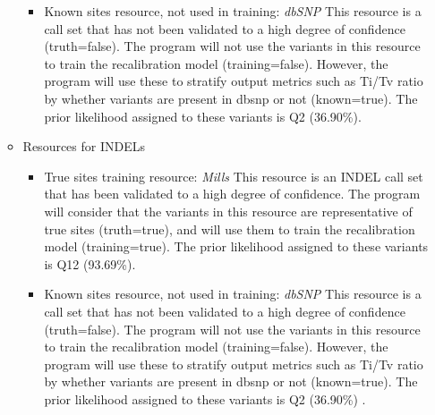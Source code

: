 \begin{itemize}
\begin{itemize}
\begin{itemize}
			\item Known sites resource, not used in training: \textit{dbSNP} \newline
This resource is a call set that has not been validated to a high degree of confidence (truth=false). The program will not use the variants in this resource to train the recalibration model (training=false). However, the program will use these to stratify output metrics such as Ti/Tv ratio by whether variants are present in dbsnp or not (known=true). The prior likelihood assigned to these variants is Q2 (36.90\%).
        \end{itemize}
    	\item Resources for INDELs
        \begin{itemize}
        	\item True sites training resource: \textit{Mills} \newline
This resource is an INDEL call set that has been validated to a high degree of confidence. The program will consider that the variants in this resource are representative of true sites (truth=true), and will use them to train the recalibration model (training=true). The prior likelihood assigned to these variants is Q12 (93.69\%).
            \item Known sites resource, not used in training: \textit{dbSNP} \newline
This resource is a call set that has not been validated to a high degree of confidence (truth=false). The program will not use the variants in this resource to train the recalibration model (training=false). However, the program will use these to stratify output metrics such as Ti/Tv ratio by whether variants are present in dbsnp or not (known=true). The prior likelihood assigned to these variants is Q2 (36.90\%) \cite{variant_recalibrator}.
        \end{itemize}
    \end{itemize}
\end{itemize}



